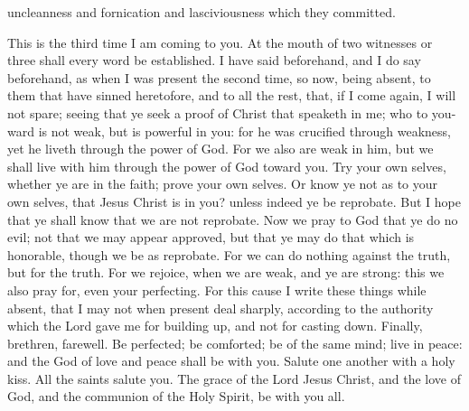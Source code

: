 uncleanness and fornication and lasciviousness which they committed. 

This is the third time I am coming to you. At the mouth of two witnesses or three shall every word be established. I have said beforehand, and I do say beforehand, as when I was present the second time, so now, being absent, to them that have sinned heretofore, and to all the rest, that, if I come again, I will not spare; seeing that ye seek a proof of Christ that speaketh in me; who to you-ward is not weak, but is powerful in you: for he was crucified through weakness, yet he liveth through the power of God. For we also are weak in him, but we shall live with him through the power of God toward you. Try your own selves, whether ye are in the faith; prove your own selves. Or know ye not as to your own selves, that Jesus Christ is in you? unless indeed ye be reprobate. But I hope that ye shall know that we are not reprobate. Now we pray to God that ye do no evil; not that we may appear approved, but that ye may do that which is honorable, though we be as reprobate. For we can do nothing against the truth, but for the truth. For we rejoice, when we are weak, and ye are strong: this we also pray for, even your perfecting. For this cause I write these things while absent, that I may not when present deal sharply, according to the authority which the Lord gave me for building up, and not for casting down.  Finally, brethren, farewell. Be perfected; be comforted; be of the same mind; live in peace: and the God of love and peace shall be with you. Salute one another with a holy kiss.  All the saints salute you.  The grace of the Lord Jesus Christ, and the love of God, and the communion of the Holy Spirit, be with you all. 